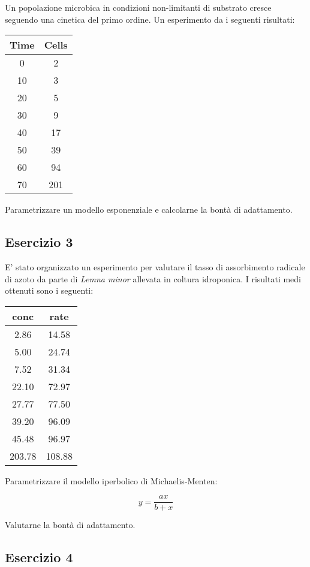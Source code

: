 \documentclass[a4paper,12pt,oneside]{book}
\begin{document}
Un popolazione microbica in condizioni non-limitanti di substrato cresce seguendo una cinetica del primo ordine. Un esperimento da i seguenti risultati:

\begin{longtable}[]{@{}cc@{}}
\toprule
Time & Cells \\
\midrule
\endhead
0 & 2 \\
10 & 3 \\
20 & 5 \\
30 & 9 \\
40 & 17 \\
50 & 39 \\
60 & 94 \\
70 & 201 \\
\bottomrule
\end{longtable}

Parametrizzare un modello esponenziale e calcolarne la bontà di adattamento.

\hypertarget{esercizio-3-7}{%
\subsection{Esercizio 3}\label{esercizio-3-7}}

E' stato organizzato un esperimento per valutare il tasso di assorbimento radicale di azoto da parte di \emph{Lemna minor} allevata in coltura idroponica. I risultati medi ottenuti sono i seguenti:

\begin{longtable}[]{@{}cc@{}}
\toprule
conc & rate \\
\midrule
\endhead
2.86 & 14.58 \\
5.00 & 24.74 \\
7.52 & 31.34 \\
22.10 & 72.97 \\
27.77 & 77.50 \\
39.20 & 96.09 \\
45.48 & 96.97 \\
203.78 & 108.88 \\
\bottomrule
\end{longtable}

Parametrizzare il modello iperbolico di Michaelis-Menten:

\[y = \frac{a x} {b + x}\]

Valutarne la bontà di adattamento.

\hypertarget{esercizio-4-5}{%
\subsection{Esercizio 4}\label{esercizio-4-5}}
\end{document}
